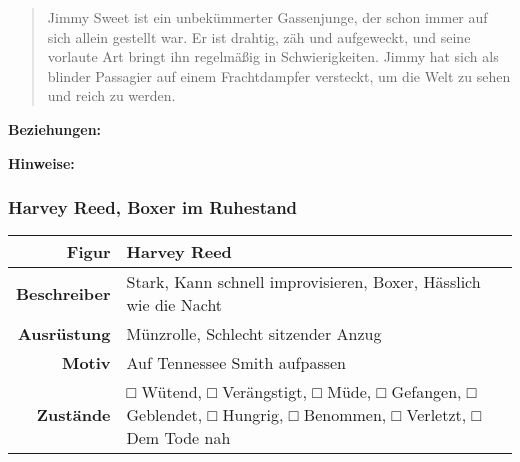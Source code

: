 \documentclass[]{article}
\begin{document}
\begin{quote}
Jimmy Sweet ist ein unbekümmerter Gassenjunge, der schon immer auf sich
allein gestellt war. Er ist drahtig, zäh und aufgeweckt, und seine
vorlaute Art bringt ihn regelmäßig in Schwierigkeiten. Jimmy hat sich
als blinder Passagier auf einem Frachtdampfer versteckt, um die Welt zu
sehen und reich zu werden.
\end{quote}

\textbf{Beziehungen:}

\textbf{Hinweise:}

\subsubsection{Harvey Reed, Boxer im
Ruhestand}\label{harvey-reed-boxer-im-ruhestand}

\begin{longtable}[]{@{}rl@{}}
\toprule
\begin{minipage}[b]{0.14\columnwidth}\raggedleft\strut
Figur
\strut\end{minipage} &
\begin{minipage}[b]{0.80\columnwidth}\raggedright\strut
Harvey Reed
\strut\end{minipage}\tabularnewline
\midrule
\endhead
\begin{minipage}[t]{0.14\columnwidth}\raggedleft\strut
\textbf{Beschreiber}
\strut\end{minipage} &
\begin{minipage}[t]{0.80\columnwidth}\raggedright\strut
Stark, Kann schnell improvisieren, Boxer, Hässlich wie die Nacht
\strut\end{minipage}\tabularnewline
\begin{minipage}[t]{0.14\columnwidth}\raggedleft\strut
\textbf{Ausrüstung}
\strut\end{minipage} &
\begin{minipage}[t]{0.80\columnwidth}\raggedright\strut
Münzrolle, Schlecht sitzender Anzug
\strut\end{minipage}\tabularnewline
\begin{minipage}[t]{0.14\columnwidth}\raggedleft\strut
\textbf{Motiv}
\strut\end{minipage} &
\begin{minipage}[t]{0.80\columnwidth}\raggedright\strut
Auf Tennessee Smith aufpassen
\strut\end{minipage}\tabularnewline
\begin{minipage}[t]{0.14\columnwidth}\raggedleft\strut
\textbf{Zustände}
\strut\end{minipage} &
\begin{minipage}[t]{0.80\columnwidth}\raggedright\strut
□ Wütend, □ Verängstigt, □ Müde, □ Gefangen, □ Geblendet, □ Hungrig, □
Benommen, □ Verletzt, □ Dem Tode nah
\strut\end{minipage}\tabularnewline
\bottomrule
\end{longtable}
\end{document}
